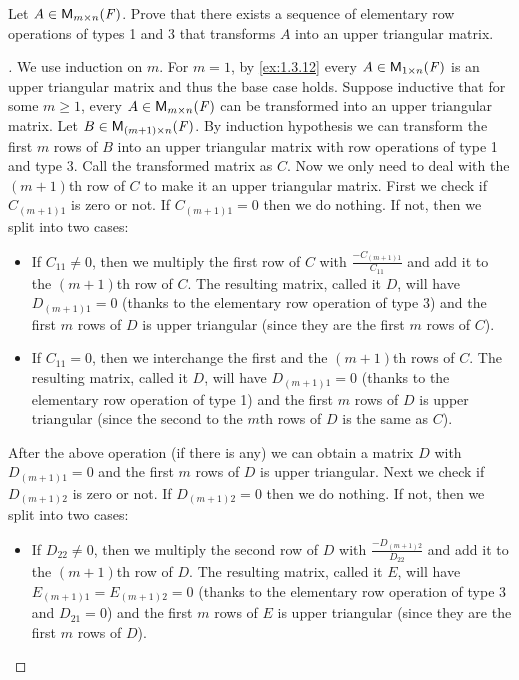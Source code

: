 \begin{ex}\label{ex:3.1.12}
	Let \(A \in \MS\).
	Prove that there exists a sequence of elementary row operations of types 1 and 3 that transforms \(A\) into an upper triangular matrix.
\end{ex}

\begin{proof}[]
	We use induction on \(m\).
	For \(m = 1\), by \cref{ex:1.3.12} every \(A \in \ms[1][n][\F]\) is an upper triangular matrix and thus the base case holds.
	Suppose inductive that for some \(m \geq 1\), every \(A \in \MS\) can be transformed into an upper triangular matrix.
	Let \(B \in \ms[(m + 1)][n][\F]\).
	By induction hypothesis we can transform the first \(m\) rows of \(B\) into an upper triangular matrix with row operations of type 1 and type 3.
	Call the transformed matrix as \(C\).
	Now we only need to deal with the \((m + 1)\)th row of \(C\) to make it an upper triangular matrix.
	First we check if \(C_{(m + 1) 1}\) is zero or not.
	If \(C_{(m + 1) 1} = 0\) then we do nothing.
	If not, then we split into two cases:
	\begin{itemize}
		\item If \(C_{1 1} \neq 0\), then we multiply the first row of \(C\) with \(\frac{-C_{(m + 1) 1}}{C_{1 1}}\) and add it to the \((m + 1)\)th row of \(C\).
		      The resulting matrix, called it \(D\), will have \(D_{(m + 1) 1} = 0\) (thanks to the elementary row operation of type 3) and the first \(m\) rows of \(D\) is upper triangular (since they are the first \(m\) rows of \(C\)).
		\item If \(C_{1 1} = 0\), then we interchange the first and the \((m + 1)\)th rows of \(C\).
		      The resulting matrix, called it \(D\), will have \(D_{(m + 1) 1} = 0\) (thanks to the elementary row operation of type 1) and the first \(m\) rows of \(D\) is upper triangular (since the second to the \(m\)th rows of \(D\) is the same as \(C\)).
	\end{itemize}
	After the above operation (if there is any) we can obtain a matrix \(D\) with \(D_{(m + 1) 1} = 0\) and the first \(m\) rows of \(D\) is upper triangular.
	Next we check if \(D_{(m + 1) 2}\) is zero or not.
	If \(D_{(m + 1) 2} = 0\) then we do nothing.
	If not, then we split into two cases:
	\begin{itemize}
		\item If \(D_{2 2} \neq 0\), then we multiply the second row of \(D\) with \(\frac{-D_{(m + 1) 2}}{D_{2 2}}\) and add it to the \((m + 1)\)th row of \(D\).
		      The resulting matrix, called it \(E\), will have \(E_{(m + 1) 1} = E_{(m + 1) 2} = 0\) (thanks to the elementary row operation of type 3 and \(D_{2 1} = 0\)) and the first \(m\) rows of \(E\) is upper triangular (since they are the first \(m\) rows of \(D\)).

\end{itemize}
\end{proof}
